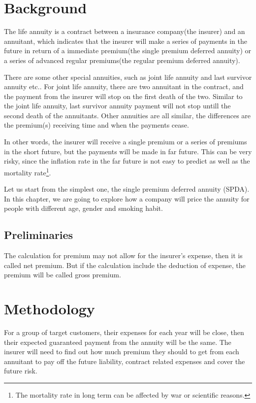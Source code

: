 \documentclass{report}
\begin{document}
\section{Background}

The life annuity is a contract between a insurance company(the insurer) and an annuitant\cite{bib:annuity-def}, which indicates that the insurer will make a series of payments in the future in return of a immediate premium(the single premium deferred annuity) or a series of advanced regular premiums(the regular premium deferred annuity). 


There are some other special annuities, such as joint life annuity and last survivor annuity etc.. For joint life annuity, there are two annuitant in the contract, and the payment from the insurer will stop on the first death of the two. Similar to the joint life annuity, last survivor annuity payment will not stop untill the second death of the annuitants. Other annuities are all similar, the differences are the premium(s) receiving time and when the payments cease. 


In other words, the insurer will receive a single premium or a series of premiums in the short future, but the payments will be made in far future. This can be very risky, since the inflation rate in the far future is not easy to predict as well as the mortality rate\footnote{The mortality rate in long term can be affected by war or scientific reasons.}.

Let us start from the simplest one, the single premium deferred annuity (SPDA). In this chapter, we are going to explore how a company will price the annuity for people with different age, gender and smoking habit.


\subsection{Preliminaries}

The calculation for premium may not allow for the insurer's expense, then it is called net premium. But if the calculation include the deduction of expense, the premium will be called gross premium.





\section{Methodology}


For a group of target customers, their expenses for each year will be close, then their expected guaranteed payment from the annuity will be the same. The insurer will need to find out how much premium they should to get from each annuitant to pay off the future liability, contract related expenses and cover the future risk.
\end{document}
